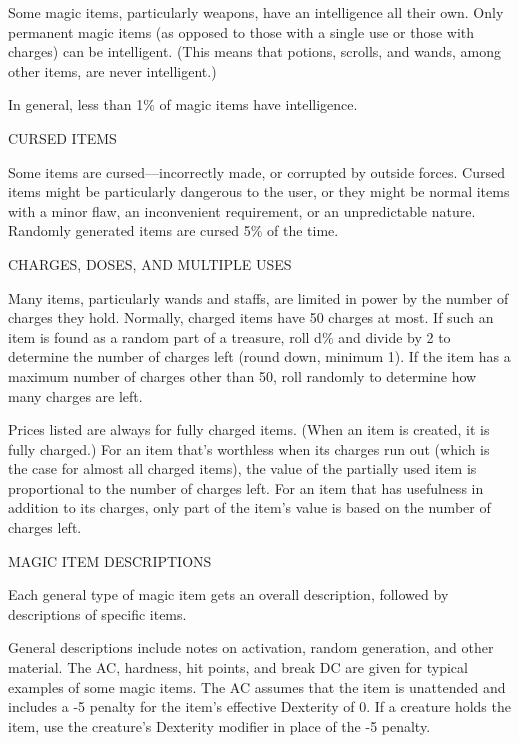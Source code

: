 Some magic items, particularly weapons, have an intelligence all their own. Only 
permanent magic items (as opposed to those with a single use or those with charges) 
can be intelligent. (This means that potions, scrolls, and wands, among other items, 
are never intelligent.)

In general, less than 1\% of magic items have intelligence. 

\vspace{12pt}
{\large CURSED ITEMS}

Some items are cursed---incorrectly made, or corrupted by outside forces. Cursed 
items might be particularly dangerous to the user, or they might be normal items 
with a minor flaw, an inconvenient requirement, or an unpredictable nature. Randomly 
generated items are cursed 5\% of the time. 

\vspace{12pt}
{\large CHARGES, DOSES, AND MULTIPLE USES}

Many items, particularly wands and staffs, are limited in power by the number of 
charges they hold. Normally, charged items have 50 charges at most. If such an 
item is found as a random part of a treasure, roll d\% and divide by 2 to determine 
the number of charges left (round down, minimum 1). If the item has a maximum number 
of charges other than 50, roll randomly to determine how many charges are left. 

Prices listed are always for fully charged items. (When an item is created, it 
is fully charged.) For an item that's worthless when its charges run out (which 
is the case for almost all charged items), the value of the partially used item 
is proportional to the number of charges left. For an item that has usefulness 
in addition to its charges, only part of the item's value is based on the number 
of charges left.

\vspace{12pt}
{\huge MAGIC ITEM DESCRIPTIONS}

Each general type of magic item gets an overall description, followed by descriptions 
of specific items.

General descriptions include notes on activation, random generation, and other 
material. The AC, hardness, hit points, and break DC are given for typical examples 
of some magic items. The AC assumes that the item is unattended and includes a 
-5 penalty for the item's effective Dexterity of 0. If a creature holds the item, 
use the creature's Dexterity modifier in place of the -5 penalty.

